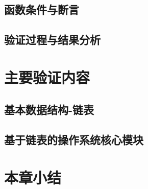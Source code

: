 \subsection{函数条件与断言}
\subsection{验证过程与结果分析}
\section{主要验证内容}
\subsection{基本数据结构-链表}
\subsection{基于链表的操作系统核心模块}
\section{本章小结}

